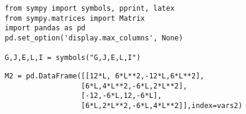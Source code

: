 \documentclass[12pt,fleqn]{article}\usepackage{../../common}
\begin{document}

\begin{verbatim}
from sympy import symbols, pprint, latex
from sympy.matrices import Matrix
import pandas as pd
pd.set_option('display.max_columns', None)

G,J,E,L,I = symbols("G,J,E,L,I")
\end{verbatim}

\begin{verbatim}
M2 = pd.DataFrame([[12*L, 6*L**2,-12*L,6*L**2],
                  [6*L,4*L**2,-6*L,2*L**2],
                  [-12,-6*L,12,-6*L],
                  [6*L,2*L**2,-6*L,4*L**2]],index=vars2)
\end{verbatim}
\end{document}
